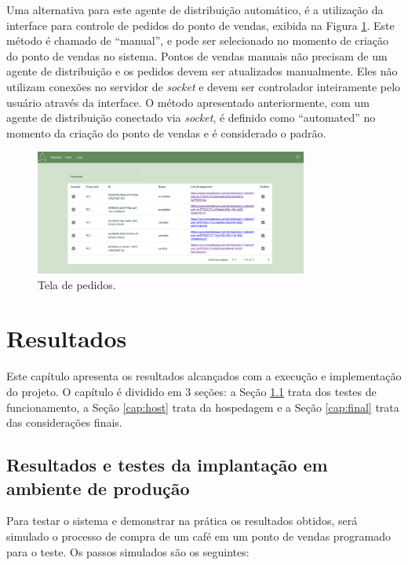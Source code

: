 Uma alternativa para este agente de distribuição automático, é a utilização da interface para controle de pedidos do ponto de vendas, exibida na Figura \ref{fig:pedidos}. Este método é chamado de ``manual'', e pode ser selecionado no momento de criação do ponto de vendas no sistema. Pontos de vendas manuais não precisam de um agente de distribuição e os pedidos devem ser atualizados manualmente. Eles não utilizam conexões no servidor de \textit{socket} e devem ser controlador inteiramente pelo usuário através da interface. O método apresentado anteriormente, com um agente de distribuição conectado via \textit{socket}, é definido como ``automated'' no momento da criação do ponto de vendas e é considerado o padrão.

\begin{figure}
    	\caption{\label{fig:pedidos}Tela de pedidos.}
    	\begin{center}
    		\includegraphics[width=0.8\textwidth]{figuras/pedidos.png}
    	\end{center}
\end{figure}

\chapter{Resultados}\label{cap:resultados}

Este capítulo apresenta os resultados alcançados com a execução e implementação do projeto. O capítulo é dividido em 3 seções: a Seção \ref{cap:test} trata dos testes de funcionamento, a Seção \ref{cap:host} trata da hospedagem e a Seção \ref{cap:final} trata das considerações finais.
    
\section{Resultados e testes da implantação em ambiente de produção} \label{cap:test}

Para testar o sistema e demonstrar na prática os resultados obtidos, será simulado o processo de compra de um café em um ponto de vendas programado para o teste. Os passos simulados são os seguintes:

